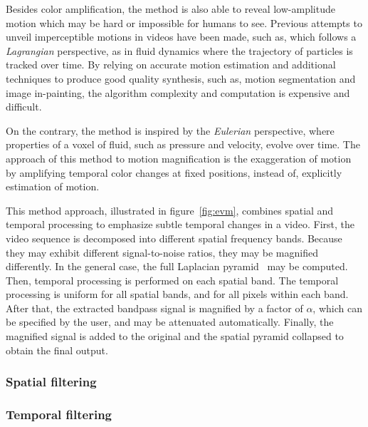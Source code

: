 Besides color amplification, the \evm{} method is also able to reveal
low-amplitude motion which may be hard or impossible for humans to see.
Previous attempts to unveil imperceptible motions in videos have been
made, such as, \cite{Liu2005Motion} which follows a \emph{Lagrangian}
perspective, as in fluid dynamics where the trajectory of particles
is tracked over time. By relying on accurate motion estimation and
additional techniques to produce good quality synthesis, such as,
motion segmentation and image in-painting, the algorithm complexity
and computation is expensive and difficult.

On the contrary, the \evm{} method is inspired by the \emph{Eulerian}
perspective, where properties of a voxel of fluid, such as pressure
and velocity, evolve over time. The approach of this method to motion
magnification is the exaggeration of motion by amplifying temporal
color changes at fixed positions, instead of, explicitly estimation
of motion.

This method approach, illustrated in figure~\ref{fig:evm}, combines
spatial and temporal processing to emphasize subtle temporal changes
in a video. First, the video sequence is decomposed into different
spatial frequency bands. Because they may exhibit different
signal-to-noise ratios, they may be magnified differently.
In the general case, the full Laplacian pyramid~\cite{Burt1983Laplacian}
may be computed. Then, temporal processing is performed on each
spatial band. The temporal processing is uniform for all spatial
bands, and for all pixels within each band. After that, the extracted
bandpass signal is magnified by a factor of $\alpha$, which can be
specified by the user, and may be attenuated automatically. Finally,
the magnified signal is added to the original and the spatial pyramid
collapsed to obtain the final output.

\subsubsection{Spatial filtering} \label{sec:sota:post:evm:spatial}


\subsubsection{Temporal filtering} \label{sec:sota:post:evm:temporal}


